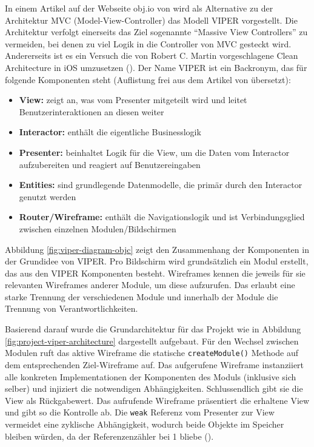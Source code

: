 In einem Artikel auf der Webseite obj.io von \cite{viper-objcio} wird als Alternative zu der Architektur MVC (Model-View-Controller) das Modell VIPER vorgestellt.
Die Architektur verfolgt einerseits das Ziel sogenannte "`Massive View Controllers"' zu vermeiden, bei denen zu viel Logik in die Controller von MVC gesteckt wird.
Andererseits ist es ein Versuch die von Robert C. Martin vorgeschlagene Clean Architecture in iOS umzusetzen (\cite{clean-architecture}).
Der Name VIPER ist ein Backronym, das für folgende Komponenten steht (Auflistung frei aus dem Artikel von \cite{viper-objcio} übersetzt):

\begin{itemize}
	\item \textbf{View:} zeigt an, was vom Presenter mitgeteilt wird und leitet Benutzerinteraktionen an diesen weiter
	\item \textbf{Interactor:} enthält die eigentliche Businesslogik
	\item \textbf{Presenter:} beinhaltet Logik für die View, um die Daten vom Interactor aufzubereiten und reagiert auf Benutzereingaben
	\item \textbf{Entities:} sind grundlegende Datenmodelle, die primär durch den Interactor genutzt werden
	\item \textbf{Router/Wireframe:} enthält die Navigationslogik und ist Verbindungsglied zwischen einzelnen Modulen/Bildschirmen
\end{itemize}


Abbildung \ref{fig:viper-diagram-objc} zeigt den Zusammenhang der Komponenten in der Grundidee von VIPER.
Pro Bildschirm wird grundsätzlich ein Modul erstellt, das aus den VIPER Komponenten besteht.
Wireframes kennen die jeweils für sie relevanten Wireframes anderer Module, um diese aufzurufen.
Das erlaubt eine starke Trennung der verschiedenen Module und innerhalb der Module die Trennung von Verantwortlichkeiten.

Basierend darauf wurde die Grundarchitektur für das Projekt wie in Abbildung \ref{fig:project-viper-architecture} dargestellt aufgebaut.
Für den Wechsel zwischen Modulen ruft das aktive Wireframe die statische \texttt{createModule()} Methode auf dem entsprechenden Ziel-Wireframe auf.
Das aufgerufene Wireframe instanziiert alle konkreten Implementationen der Komponenten des Moduls (inklusive sich selber) und injiziert die notwendigen Abhängigkeiten.
Schlussendlich gibt sie die View als Rückgabewert.
Das aufrufende Wireframe präsentiert die erhaltene View und gibt so die Kontrolle ab.
Die \texttt{weak} Referenz vom Presenter zur View vermeidet eine zyklische Abhängigkeit, wodurch beide Objekte im Speicher bleiben würden, da der Referenzenzähler bei 1 bliebe (\cite{automatic-reference-counting}).

